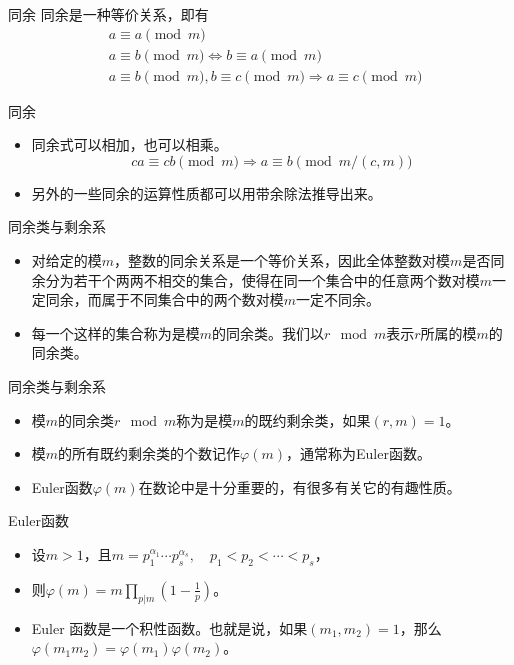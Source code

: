 \documentclass[dvipdfmx]{beamer}
\begin{document}
\begin{frame}{同余}
同余是一种等价关系，即有
\begin{eqnarray*}
&a\equiv a\pmod{m}\\
&a\equiv b\pmod{m} \iff b\equiv a\pmod{m} \\
&a\equiv b\pmod{m}, b \equiv c\pmod{m} \Rightarrow a\equiv c\pmod{m}
\end{eqnarray*}
\end{frame}

\begin{frame}{同余}
\begin{itemize}
\item 同余式可以相加，也可以相乘。
\begin{displaymath}
ca\equiv cb\pmod{m} \Rightarrow a\equiv b\pmod{m/(c,m)}
\end{displaymath}
\item 另外的一些同余的运算性质都可以用带余除法推导出来。
\end{itemize}
\end{frame}

\begin{frame}{同余类与剩余系}
\begin{itemize}
\item 对给定的模$m$，整数的同余关系是一个等价关系，因此全体整数对模$m$是否同余分为若干个两两不相交的集合，使得在同一个集合中的任意两个数对模$m$一定同余，而属于不同集合中的两个数对模$m$一定不同余。
\pause
\item 每一个这样的集合称为是模$m$的同余类。我们以$r \mod m$表示$r$所属的模$m$的同余类。
\end{itemize}
\end{frame}

\begin{frame}{同余类与剩余系}
\begin{itemize}
\item 模$m$的同余类$r \mod m$称为是模$m$的既约剩余类，如果$(r,m)=1$。
\item 模$m$的所有既约剩余类的个数记作$\varphi(m)$，通常称为Euler函数。
\item Euler函数$\varphi(m)$在数论中是十分重要的，有很多有关它的有趣性质。
\end{itemize}
\end{frame}

\begin{frame}{Euler函数}
\begin{itemize}
\item 设$m>1$，且$m=p_1^{\alpha_1} \dotsm p_s^{\alpha_s},\quad p_1<p_2<\dotsb<p_s$，
\item 则$\varphi(m)=m\prod_{p|m}\left(1-\frac{1}{p}\right)$。
\item Euler 函数是一个积性函数。也就是说，如果$(m_1,m_2)=1$，那么$\varphi(m_1m_2)=\varphi(m_1)\varphi(m_2)$。
\end{itemize}
\end{frame}
\end{document}
